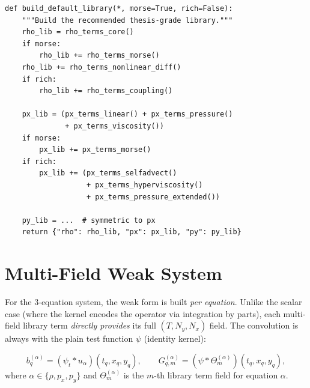 \documentclass[11pt]{article}
\begin{document}
\begin{lstlisting}[caption={multifield.py --- build\_default\_library}]
def build_default_library(*, morse=True, rich=False):
    """Build the recommended thesis-grade library."""
    rho_lib = rho_terms_core()
    if morse:
        rho_lib += rho_terms_morse()
    rho_lib += rho_terms_nonlinear_diff()
    if rich:
        rho_lib += rho_terms_coupling()

    px_lib = (px_terms_linear() + px_terms_pressure()
              + px_terms_viscosity())
    if morse:
        px_lib += px_terms_morse()
    if rich:
        px_lib += (px_terms_selfadvect()
                   + px_terms_hyperviscosity()
                   + px_terms_pressure_extended())

    py_lib = ...  # symmetric to px
    return {"rho": rho_lib, "px": px_lib, "py": py_lib}
\end{lstlisting}


\section{Multi-Field Weak System}
\label{sec:multifield_system}

For the 3-equation system, the weak form is built \emph{per equation}.
Unlike the scalar case (where the kernel encodes the operator via
integration by parts), each multi-field library term \emph{directly
provides} its full $(T,N_y,N_x)$ field.  The convolution is always with
the plain test function $\psi$ (identity kernel):

\begin{equation}\label{eq:multifield_weak}
  b_q^{(\alpha)} = (\psi_t * u_\alpha)(t_q, x_q, y_q),
  \qquad
  G_{q,m}^{(\alpha)} = (\psi * \Theta_m^{(\alpha)})(t_q, x_q, y_q),
\end{equation}
where $\alpha \in \{\rho, p_x, p_y\}$ and $\Theta_m^{(\alpha)}$ is the
$m$-th library term field for equation $\alpha$.
\end{document}
